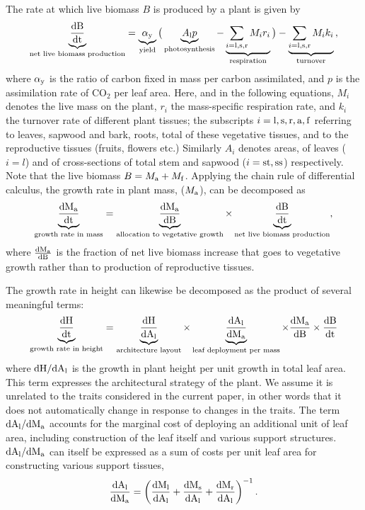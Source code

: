 \documentclass[a4paper,11pt]{article}
\begin{document}
The rate at which live biomass $B$ is produced by a plant is given by
\begin{equation}\label{eq:eq0}
\underbrace{\frac{\rm{d} B}{\rm{d} t}}_{\text{net live biomass production}} = \underbrace{\alpha_{\rm y}}_{\text{yield}}  \big(\underbrace{A_{\rm l} p}_{\text{photosynthesis}} - \underbrace{\sum_{i = {\rm l,s,r}} M_{i} r_{i}}_{\text{respiration}}\big) - \underbrace{ \sum_{i = \rm{l,s,r}} M_{i} k_{i}}_{\text{turnover}} \, ,
\end{equation}
where $\alpha_{\rm y}$ is the ratio of carbon fixed in mass per carbon assimilated, and $p$ is the assimilation rate of CO$_{2}$ per leaf area. Here, and in the following equations, $M_i$ denotes the live mass on the plant, $r_i$ the mass-specific respiration rate, and $k_i$ the turnover rate of different plant tissues; the subscripts $i = \rm{l,s,r,a,f}$ referring to leaves, sapwood and bark, roots, total of these vegetative tissues, and to the reproductive tissues (fruits, flowers etc.)  Similarly $A_i$ denotes areas, of leaves ($i = l$) and of cross-sections of total stem and sapwood ($i =\rm{st,ss}$) respectively. Note that the live biomass $B = M_{\rm a} + M_{\rm f}$.  Applying the chain rule of differential calculus, the growth rate in plant mass, ($M_{\rm a} $), can be decomposed as
\begin{equation}\label{eq:eq1}
\underbrace{{\frac{\rm{d} M_{\rm a} }{\rm{d} t}}}_{\text{growth rate in mass}} = \underbrace{\frac{\rm{d} M_{\rm a} }{\rm{d} B}}_{\text{allocation to vegetative growth}}  \times \underbrace{\frac{\rm{d} B}{\rm{d} t}}_{\text{net live biomass production}},
\end{equation}
where $\frac{\rm{d} M_{\rm a} }{\rm{d} B}$ is the fraction of net live biomass increase that goes to vegetative growth rather than to production of reproductive tissues.

The growth rate in height can likewise be decomposed as the product of several meaningful terms:
\begin{equation}\label{eq:eq2}
\underbrace{\frac{\rm{d} H}{\rm{d} t}}_{\text{growth rate in height}} = \underbrace{\frac{\rm{d} H}{\rm{d} A_{\rm l}}}_{\text{architecture layout}} \times \underbrace{{\frac{\rm{d} A_{\rm l}}{\rm{d} M_{\rm a} }}}_{\text{leaf deployment per mass}} \times {\frac{\ensuremath{\rm{d}}M_{\rm a} }{\ensuremath{\rm{d}}B}} \times {\frac{\ensuremath{\rm{d}}B}{\ensuremath{\rm{d}}t}}
\end{equation}
where $\rm{d} H / \rm{d} A_{\rm l}$ is the growth in plant height
per unit growth in total leaf area. This term expresses the architectural
strategy of the plant. We assume it is unrelated to the traits considered in the current paper, in other words that it does not automatically change in response to changes in the traits. The term $\rm{d} A_{\rm l} / \rm{d} M_{\rm a} $
accounts for the marginal cost of deploying an additional unit of leaf
area, including construction of the leaf itself and various support
structures.  $\rm{d} A_{\rm l} / \rm{d} M_{\rm a} $
can itself be expressed as a sum of costs per unit leaf
area for constructing various support tissues,
\begin{equation}\label{eq:daldmt}
\frac{\rm{d} A_{\rm l}}{\rm{d} M_{\rm a} }
= \left(\frac{\rm{d} M_{\rm l}}{\rm{d} A_{\rm l}}
 +  \frac{\rm{d} M_{\rm s}}{\rm{d} A_{\rm l}} + \frac{\rm{d} M_{\rm r}}{\rm{d} A_{\rm l}}\right)^{-1}.
\end{equation}
\end{document}
